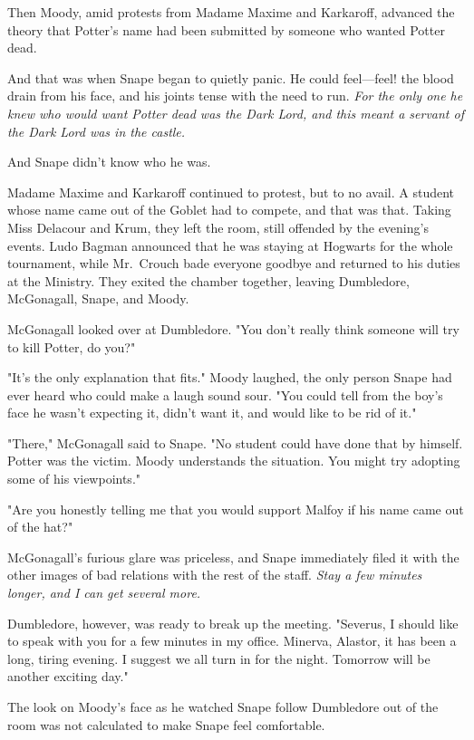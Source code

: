 Then Moody, amid protests from Madame Maxime and Karkaroff, advanced the theory that Potter's name had been submitted by someone who wanted Potter dead.

And that was when Snape began to quietly panic. He could feel—feel! the blood drain from his face, and his joints tense with the need to run. \emph{For the only one he knew who would want Potter dead was the Dark Lord, and this meant a servant of the Dark Lord was in the castle.}

And Snape didn't know who he was.

Madame Maxime and Karkaroff continued to protest, but to no avail. A student whose name came out of the Goblet had to compete, and that was that. Taking Miss Delacour and Krum, they left the room, still offended by the evening's events. Ludo Bagman announced that he was staying at Hogwarts for the whole tournament, while Mr.~Crouch bade everyone goodbye and returned to his duties at the Ministry. They exited the chamber together, leaving Dumbledore, McGonagall, Snape, and Moody.

McGonagall looked over at Dumbledore. "You don't really think someone will try to kill Potter, do you?"

"It's the only explanation that fits." Moody laughed, the only person Snape had ever heard who could make a laugh sound sour. "You could tell from the boy's face he wasn't expecting it, didn't want it, and would like to be rid of it."

"There," McGonagall said to Snape. "No student could have done that by himself. Potter was the victim. Moody understands the situation. You might try adopting some of his viewpoints."

"Are you honestly telling me that you would support Malfoy if his name came out of the hat?"

McGonagall's furious glare was priceless, and Snape immediately filed it with the other images of bad relations with the rest of the staff. \emph{Stay a few minutes longer, and I can get several more.}

Dumbledore, however, was ready to break up the meeting. "Severus, I should like to speak with you for a few minutes in my office. Minerva, Alastor, it has been a long, tiring evening. I suggest we all turn in for the night. Tomorrow will be another exciting day."

The look on Moody's face as he watched Snape follow Dumbledore out of the room was not calculated to make Snape feel comfortable.

